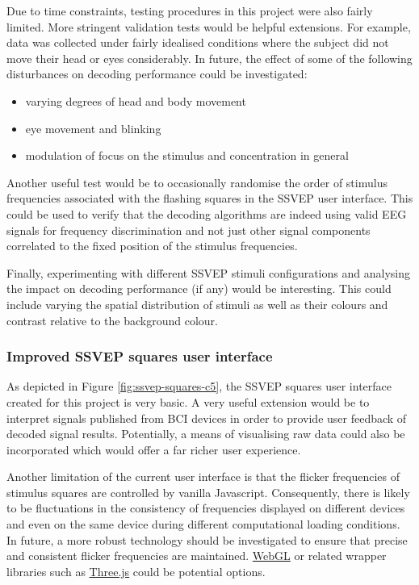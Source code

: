 Due to time constraints, testing procedures in this project were also fairly limited. More stringent validation tests would be helpful extensions. For example, data was collected under fairly idealised conditions where the subject did not move their head or eyes considerably. In future, the effect of some of the following disturbances on decoding performance could be investigated:
\begin{itemize}
    \item varying degrees of head and body movement
    \item eye movement and blinking
    \item modulation of focus on the stimulus and concentration in general
\end{itemize}
Another useful test would be to occasionally randomise the order of stimulus frequencies associated with the flashing squares in the SSVEP user interface. This could be used to verify that the decoding algorithms are indeed using valid EEG signals for frequency discrimination and not just other signal components correlated to the fixed position of the stimulus frequencies. 

Finally, experimenting with different SSVEP stimuli configurations and analysing the impact on decoding performance (if any) would be interesting. This could include varying the spatial distribution of stimuli as well as their colours and contrast relative to the background colour.

\subsubsection{Improved SSVEP squares user interface}
As depicted in Figure \ref{fig:ssvep-squares-c5}, the SSVEP squares user interface created for this project is very basic. A very useful extension would be to interpret signals published from BCI devices in order to provide user feedback of decoded signal results. Potentially, a means of visualising raw data could also be incorporated which would offer a far richer user experience. 

Another limitation of the current user interface is that the flicker frequencies of stimulus squares are controlled by vanilla Javascript. Consequently, there is likely to be fluctuations in the consistency of frequencies displayed on different devices and even on the same device during different computational loading conditions. In future, a more robust technology should be investigated to ensure that precise and consistent flicker frequencies are maintained. \href{https://www.khronos.org/webgl/}{WebGL} or related wrapper libraries such as \href{https://threejs.org/}{Three.js} could be potential options.

